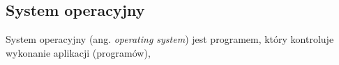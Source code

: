 \documentclass{mwart}
\begin{document}
\subsection{System operacyjny}
\begin{comment}
%
\indent
	Michael J.~Flynn stworzył klasyfikację systemów komputerowych oraz programów, zwaną \emph{taksonomią Flynna}, w~której ze względu na liczbę
	strumieni rozkazów oraz danych, wyróżniamy cztery klasy:
	\begin{center}
	\begin{tabular}{|c|c|c|} \hline
													 & Jeden strumień instrukcji	 & Wiele strumieni instukcji \\
													 & (\emph{Single Instruction}) & (\emph{Multiple Instruction}) \\\hline
			Jeden                &     												 &      \\
			strumień danych      &  SISD										   & MISD 			\\
			(\emph{Single Data}) &                             & \\\hline
			Wiele                &     												 &      \\
			strumieni danych     & SIMD                        & MIMD \\
			(\emph{Multiple Data}) & 										 & 			\\\hline
	\end{tabular}
	\begin{small} Tabela 4. Taksonomia Flynna \end{small}
	\end{center}
	Klasy te możemy scharakteryzowac w~następujący sposób:
	\begin{itemize}
		\item SISD jest klasą programów wykonywanych sekwencyjnie na maszynie sekwencyjnej (skalarnej);
		\item SIMD odpowiada programom wykonywanym na maszynie wektorowej (superskalarnej) lub na procesorach przetwarzających sygnały (DSP);
		\item MISD jest klasą maszyni i~programów, która ma zastosowanie tam, gdzie liczy się minimalizacja błędów;
		\item MIMD odpowiada programom wykonywanym na wielu procesorach (wielordzeniowe, klastry, itp.).
	\end{itemize}
\par
\end{comment}
%
\indent
	System operacyjny (ang. \emph{operating system}) jest programem, który kontroluje wykonanie aplikacji (programów),
\end{document}
